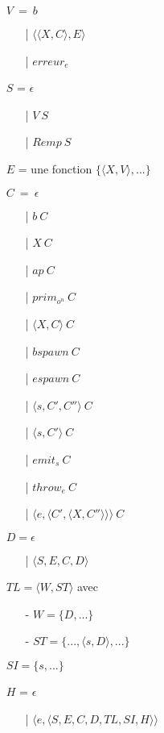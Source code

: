 \documentclass[10pt,a4paper]{article}
\begin{document}
				\begin{itemize}
					\item[] $V~=~b$
					\begin{itemize}
						\item[|] $\langle\langle X,C\rangle,E\rangle$
						\item[|] $erreur_{e}$
					\end{itemize}
					\item[] $S$ = $\epsilon$ 
					\begin{itemize}
						\item[|] $V~S$ 
						\item[|] $Remp~S$
					\end{itemize}
					\item[] $E$ = une fonction $\{\langle X,V\rangle,...\}$
					\item[] $C~=~\epsilon$ 
					\begin{itemize}
						\item[|] $b~C$
						\item[|] $X~C$
						\item[|] $ap~C$
						\item[|] $prim_{o^{n}}~C$  
						\item[|] $\langle X,C\rangle~C$
						\item[|] $bspawn~C$ 
						\item[|] $espawn~C$
						\item[|] $\langle s,C',C''\rangle~C$
						\item[|] $\langle s,C'\rangle~C$ 
						\item[|] $emit_{s}~C$ 
						\item[|] $throw_{e}~C$
						\item[|] $\langle e,\langle C',\langle X,C''\rangle\rangle\rangle~C$ 
					\end{itemize}
					\item[] $D = \epsilon$
					\begin{itemize}
						\item[|] $\langle S,E,C,D\rangle$ 
					\end{itemize}
					\item[] $TL = \langle W,ST\rangle$ avec 
					\begin{itemize}
						\item[] - $W = \{D,...\}$
						\item[] - $ST = \{...,\langle s,D\rangle,...\}$
					\end{itemize}
					\item[] $SI = \{ s,...\}$
					\item[] $H$ = $\epsilon$ 
					\begin{itemize}
						\item[|] $\langle e,\langle S,E,C,D,TL,SI,H\rangle\rangle$ 
					\end{itemize}
				\end{itemize}
				\bigbreak
				\bigbreak
				
\end{document}
